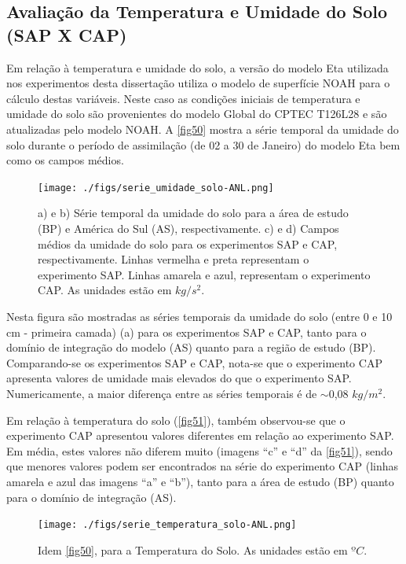 \subsection{Avaliação da Temperatura e Umidade do Solo (SAP X CAP)}
\label{ss:avaltempumi}

Em relação à temperatura e umidade do solo, a versão do modelo Eta utilizada nos experimentos desta dissertação utiliza o modelo de superfície NOAH para o cálculo destas variáveis. Neste caso as condições iniciais de temperatura e umidade do solo são provenientes do modelo Global do CPTEC T126L28 e são atualizadas pelo modelo NOAH. A \autoref{fig50} mostra a série temporal da umidade do solo durante o período de assimilação (de 02 a 30 de Janeiro) do modelo Eta bem como os campos médios.

\begin{figure}[!hbp]
\centering
\texttt{[image: ./figs/serie\_umidade\_solo-ANL.png]}
\caption{a) e b) Série temporal da umidade do solo para a área de estudo (BP) e América do Sul (AS), respectivamente. c) e d) Campos médios da umidade do solo para os experimentos SAP e CAP, respectivamente. Linhas vermelha e preta representam o experimento SAP. Linhas amarela e azul, representam o experimento CAP. As unidades estão em $kg/s^{2}$.}
\label{fig50}
\end{figure}

Nesta figura são mostradas as séries temporais da umidade do solo (entre 0 e 10 cm - primeira camada) (a) para os experimentos SAP e CAP, tanto para o domínio de integração do modelo (AS) quanto para a região de estudo (BP). Comparando-se os experimentos SAP e CAP, nota-se que o experimento CAP apresenta valores de umidade mais elevados do que o experimento SAP. Numericamente, a maior diferença entre as séries temporais é de $\sim$0,08 $kg/m^{2}$.

Em relação à temperatura do solo (\autoref{fig51}), também observou-se que o experimento CAP apresentou valores diferentes em relação ao experimento SAP. Em média, estes valores não diferem muito (imagens ``c'' e ``d'' da \autoref{fig51}), sendo que menores valores podem ser encontrados na série do experimento CAP (linhas amarela e azul das imagens ``a'' e ``b''), tanto para a área de estudo (BP) quanto para o domínio de integração (AS).

\begin{figure}[!hbp]
\centering
\texttt{[image: ./figs/serie\_temperatura\_solo-ANL.png]}
\caption{Idem \autoref{fig50}, para a Temperatura do Solo. As unidades estão em $ºC$.}
\label{fig51}
\end{figure}

